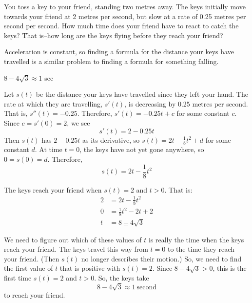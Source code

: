 \begin{question}
You toss a key to your friend, standing two metres away. The keys initially move towards your friend at 2 metres per second, but slow at a rate of 0.25 metres per second per second. How much time does your friend have to react to catch the keys? That is--how long are the keys flying before they reach your friend?
\end{question}
\begin{hint}
Acceleration is constant, so finding a formula for the distance your keys have travelled is a similar problem to finding a formula for something falling.
\end{hint}
\begin{answer}
$8-4\sqrt{3}\approx 1$ sec
\end{answer}
\begin{solution}
Let $s(t)$ be the distance your keys have travelled since they left your hand. The rate at which they are travelling, $s'(t)$, is decreasing by 0.25 metres per second. That is,
$s''(t)=-0.25$. Therefore, $s'(t)=-0.25t+c$ for some constant $c$. Since $c=s'(0)=2$, we see
\[s'(t)=2-0.25t\]
Then $s(t)$ has $2-0.25t$ as its derivative, so $s(t)=2t-\frac{1}{8}t^2+d$ for some constant $d$. At time $t=0$, the keys have not yet gone anywhere, so $0=s(0)=d$. Therefore,
\[s(t)=2t-\frac{1}{8}t^2\]

The keys reach your friend when $s(t)=2$ and $t>0$. That is:
\begin{align*}
2&=2t-\frac{1}{8}t^2\\
0&=\frac{1}{8}t^2-2t+2\\
t&=8\pm4\sqrt{3}
\end{align*}

We need to figure out which of these values of $t$ is really the time when the keys reach your friend. The keys travel this way from $t=0$ to the time they reach your friend. (Then $s(t)$ no longer describes their motion.) So, we need to find the first value of $t$ that is positive with $s(t)=2$. Since $8-4\sqrt{3}>0$, this is the first time $s(t)=2$ and $t>0$. So, the keys take
\[8-4\sqrt{3}\approx 1~\mbox{second}\]
to reach your friend.
\end{solution}



